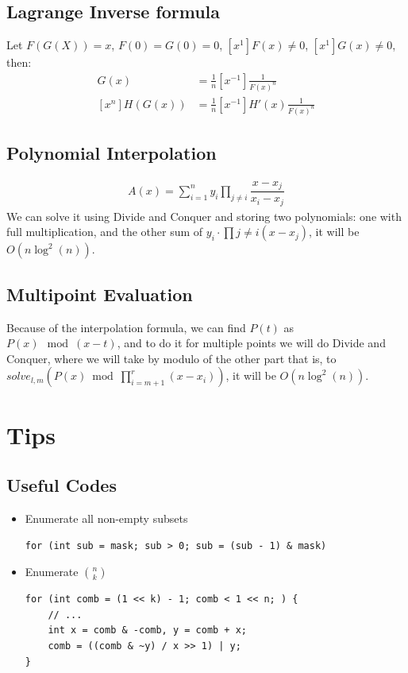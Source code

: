 \documentclass[10pt]{article}
\begin{document}
{\subsection{Lagrange Inverse formula} Let $F(G(X)) = x$, $F(0) = G(0) = 0$, $[x^1]F(x) \neq 0$, $[x^1]G(x) \neq 0$, then:
\begin{align*}
    [x^n] G(x) &= \frac{1}{n} [x^{-1}] \frac{1}{F(x)^n} \\
    [x^n] H(G(x)) &= \frac{1}{n} [x^{-1}] H'(x) \frac{1}{F(x)^n}
\end{align*}

\subsection{Polynomial Interpolation}
\begin{eqnarray*}
    A(x) = \sum\limits_{i=1}^{n} y_i \prod\limits_{j \ne i} \dfrac{x - x_j}{x_i - x_j}
\end{eqnarray*}
We can solve it using Divide and Conquer and storing two polynomials: one with full multiplication, and the other sum of
$y_i \cdot \prod{j \ne i} (x - x_j)$, it will be $O(n \log^2(n))$.

\subsection{Multipoint Evaluation}
Because of the interpolation formula, we can find $P(t)$ as $P(x) \mod (x - t)$, and to do it for multiple points we will
do Divide and Conquer, where we will take by modulo of the other part that is, to $solve_{l, m}\left(P(x) \bmod \prod\limits_{i=m+1}^{r}(x - x_i)\right)$, it will be $O(n \log^2(n))$.

\section{Tips}
\subsection{Useful Codes}
\begin{itemize}
\item Enumerate all non-empty subsets
\begin{lstlisting}[frame=none]
for (int sub = mask; sub > 0; sub = (sub - 1) & mask)
\end{lstlisting}
\item Enumerate $\binom{n}{k}$
\begin{lstlisting}[frame=none]
for (int comb = (1 << k) - 1; comb < 1 << n; ) {
	// ...
	int x = comb & -comb, y = comb + x;
	comb = ((comb & ~y) / x >> 1) | y;
}
\end{lstlisting}
\end{itemize}
}
\end{document}
